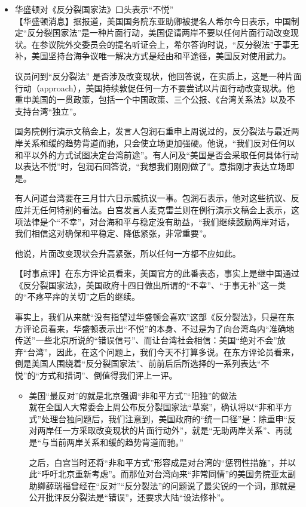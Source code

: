 \documentclass[a4paper,11pt]{article}
\begin{document}
\begin{itemize}
\item 华盛顿对《反分裂国家法》口头表示“不悦”\\
\label{sec-4_2}%
【华盛顿消息】据报道，美国国务院东亚助卿被提名人希尔今日表示，中国制定“反分裂国家法”是一种片面行动，美国促请两岸不要以任何片面行动改变现状。在参议院外交委员会的提名听证会上，希尔答询时说，“反分裂法”于事无补，美国坚持台海争议唯一解决方式是经由和平途径，美国反对使用武力。

   议员问到“反分裂法” 是否涉及改变现状，他回答说，在实质上，这是一种片面行动（approach），美国持续敦促任何一方不要尝试以片面行动改变现状。他重申美国的一贯政策，包括一个中国政策、三个公报、《台湾关系法》以及不支持台湾“独立”。

   国务院例行演示文稿会上，发言人包润石重申上周说过的，反分裂法与最近两岸关系和缓的趋势背道而驰，只会使立场更加强硬。他说，“我们反对任何以和平以外的方式试图决定台湾前途”。有人问及“美国是否会采取任何具体行动以表达不悦”时，包润石回答说，“我想我们刚刚做了”。意指刚才表达立场即是。

   有人问道台湾要在三月廿六日示威抗议一事。包润石表示，他对这些抗议、反应并无任何特别的看法。白宫发言人麦克雷兰则在例行演示文稿会上表示，这项法律是个“不幸”，对台海和平与稳定没有助益，“我们继续鼓励两岸对话，我们相信这对确保和平稳定、降低紧张，非常重要”。

   他说，片面改变现状会升高紧张，所以任何一方都不应如此。
 

   【时事点评】在东方评论员看来，美国官方的此番表态，事实上是继中国通过《反分裂国家法》，美国政府十四日做出所谓的“不幸”、“于事无补”这一类的“不疼平痒的关切”之后的继续。
 
  事实上，我们从来就“没有指望过华盛顿会喜欢”这部《反分裂法》，只是在东方评论员看来，华盛顿表示出“不悦”的本身、不过是为了向台湾岛内“准确地传送”一些北京所说的“错误信号”、而让台湾社会相信：美国“绝对不会”放弃“台湾”，因此，在这个问题上，我们今天不打算多说。在东方评论员看来，倒是美国人围绕着“反分裂国家法”、前前后后所选择的一系列表达“不悦”的“方式和措词”、倒值得我们评上一评。
 
\begin{itemize}

\item 美国“最反对”的就是北京强调“非和平方式”“阻独”的做法\\
\label{sec-4_2_1}%
就在全国人大常委会上周公布反分裂国家法“草案”，确认将以“非和平方式”处理台独问题后，我们注意到，美国政府的“统一口径”是：除重申“反对两岸任一方采取改变现状的片面行动外”，就是“无助两岸关系”、再就是“与当前两岸关系和缓的趋势背道而驰。”

    之后，白宫当时还将“非和平方式”形容成是对台湾的“惩罚性措施”，并以此“呼吁北京重新考虑”。而那位对台湾向来“非常同情”的美国务院亚太副助卿薛瑞福曾经在“反对”“反分裂法”的问题说了最尖锐的一个词，那就是公开批评反分裂法是“错误”，还要求大陆“设法修补”。


\end{itemize}
\end{itemize}
\end{document}

